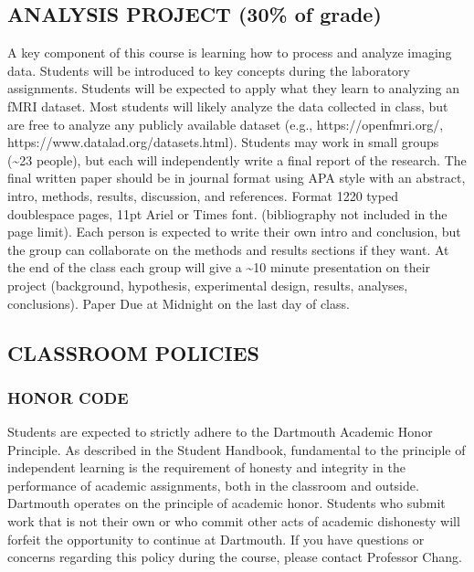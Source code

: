 \documentclass[letterpaper,10pt,english]{sphinxmanual}
\begin{document}
\subsection{ANALYSIS PROJECT (30\% of grade)}
\label{\detokenize{content/Syllabus:analysis-project-30-of-grade}}
A key component of this course is learning how to process and analyze imaging data. Students will be introduced to key concepts during the laboratory assignments. Students will be expected to apply what they learn to analyzing an fMRI dataset. Most students will likely analyze the data collected in class, but are free to analyze any publicly available dataset (e.g., https://openfmri.org/, https://www.datalad.org/datasets.html). Students may work in small groups (\textasciitilde{}2\sphinxhyphen{}3 people), but each will independently write a final report of the research.  The final written paper should be in journal format using APA style with an abstract, intro, methods, results, discussion, and references. Format 12\sphinxhyphen{}20 typed double\sphinxhyphen{}space pages, 11pt Ariel or Times font. (bibliography not included in the page limit).  Each person is expected to write their own intro and conclusion, but the group can collaborate on the methods and results sections if they want.  At the end of the class each group will give a \textasciitilde{}10 minute presentation on their project (background, hypothesis, experimental design, results, analyses, conclusions).  Paper Due at Midnight on the last day of class.


\subsection{CLASSROOM POLICIES}
\label{\detokenize{content/Syllabus:classroom-policies}}

\subsubsection{HONOR CODE}
\label{\detokenize{content/Syllabus:honor-code}}
Students are expected to strictly adhere to the Dartmouth Academic Honor Principle. As described in the Student Handbook, fundamental to the principle of independent learning is the requirement of honesty and integrity in the performance of academic assignments, both in the classroom and outside. Dartmouth operates on the principle of academic honor. Students who submit work that is not their own or who commit other acts of academic dishonesty will forfeit the opportunity to continue at Dartmouth. If you have questions or concerns regarding this policy during the course, please contact Professor Chang.
\end{document}
